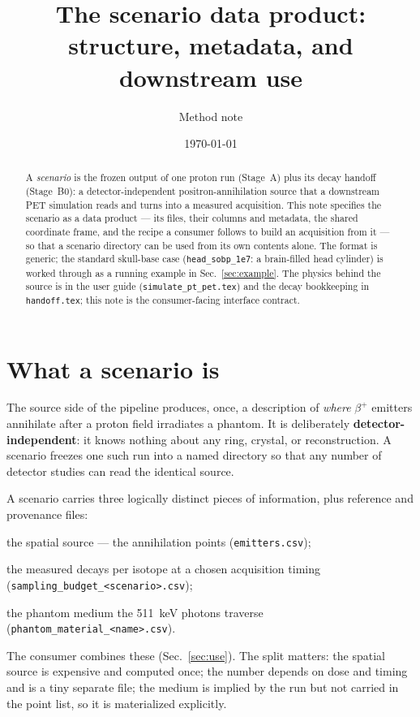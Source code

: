 \documentclass[11pt]{article}
\title{The scenario data product:\\
structure, metadata, and downstream use}
\author{Method note}
\date{\today}
\newcommand{\file}[1]{\texttt{#1}}
\begin{document}
\maketitle

\begin{abstract}
A \emph{scenario} is the frozen output of one proton run (Stage~A) plus its
decay handoff (Stage~B0): a detector-independent positron-annihilation source
that a downstream PET simulation reads and turns into a measured acquisition.
This note specifies the scenario as a data product --- its files, their columns
and metadata, the shared coordinate frame, and the recipe a consumer follows to
build an acquisition from it --- so that a scenario directory can be used from
its own contents alone. The format is generic; the standard skull-base case
(\file{head\_sobp\_1e7}: a brain-filled head cylinder) is worked through as a
running example in Sec.~\ref{sec:example}. The physics behind the source is in
the user guide (\file{simulate\_pt\_pet.tex}) and the decay bookkeeping in
\file{handoff.tex}; this note is the consumer-facing interface contract.
\end{abstract}

\section{What a scenario is}

The source side of the pipeline produces, once, a description of \emph{where}
$\beta^{+}$ emitters annihilate after a proton field irradiates a phantom. It is
deliberately \textbf{detector-independent}: it knows nothing about any ring,
crystal, or reconstruction. A scenario freezes one such run into a named
directory so that any number of detector studies can read the identical source.

A scenario carries three logically distinct pieces of information, plus
reference and provenance files:
\begin{description}[leftmargin=1.6em]
  \item[\emph{where}] the spatial source --- the annihilation points
    (\file{emitters.csv});
  \item[\emph{how many}] the measured decays per isotope at a chosen acquisition
    timing (\file{sampling\_budget\_<scenario>.csv});
  \item[\emph{through what}] the phantom medium the \SI{511}{keV} photons
    traverse (\file{phantom\_material\_<name>.csv}).
\end{description}
The consumer combines these (Sec.~\ref{sec:use}). The split matters: the spatial
source is expensive and computed once; the number depends on dose and timing and
is a tiny separate file; the medium is implied by the run but not carried in the
point list, so it is materialized explicitly.
\end{document}
